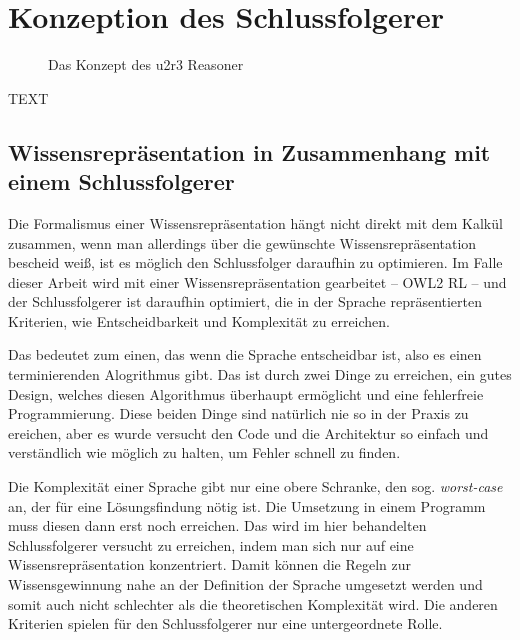 \chapter{Konzeption des Schlussfolgerer}

\begin{figure}[htb]
\begin{center}
  \caption{Das Konzept des u2r3 Reasoner}
  \label{image-konzept}
\end{center}
\end{figure}
TEXT



\section{Wissensrepräsentation in Zusammenhang mit einem Schlussfolgerer}

Die Formalismus einer Wissensrepräsentation hängt nicht direkt mit dem Kalkül zusammen, wenn man allerdings über die gewünschte Wissensrepräsentation bescheid weiß, ist es möglich den Schlussfolger daraufhin zu optimieren. Im Falle dieser Arbeit wird mit einer Wissensrepräsentation gearbeitet -- OWL2 RL -- und der Schlussfolgerer ist daraufhin optimiert, die in der Sprache repräsentierten Kriterien, wie Entscheidbarkeit und Komplexität zu erreichen.

Das bedeutet zum einen, das wenn die Sprache entscheidbar ist, also es einen terminierenden Alogrithmus gibt. Das ist durch zwei Dinge zu erreichen, ein gutes Design, welches diesen Algorithmus überhaupt ermöglicht und eine fehlerfreie Programmierung. Diese beiden Dinge sind natürlich nie so in der Praxis zu ereichen, aber es wurde versucht den Code und die Architektur so einfach und verständlich wie möglich zu halten, um Fehler schnell zu finden.

Die Komplexität einer Sprache gibt nur eine obere Schranke, den sog. \emph{worst-case} an, der für eine Lösungsfindung nötig ist. Die Umsetzung in einem Programm muss diesen dann erst noch erreichen. Das wird im hier behandelten Schlussfolgerer versucht zu erreichen, indem man sich nur auf eine Wissensrepräsentation konzentriert. Damit können die Regeln zur Wissensgewinnung nahe an der Definition der Sprache umgesetzt werden und somit auch nicht schlechter als die theoretischen Komplexität wird.
Die anderen Kriterien spielen für den Schlussfolgerer nur eine untergeordnete Rolle.



